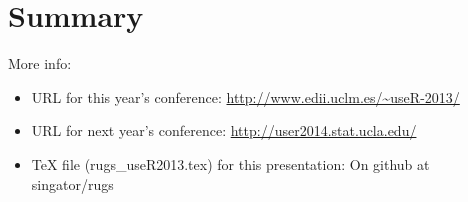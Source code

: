 \documentclass{beamer}
\begin{document}
\section*{Summary}
\begin{frame}
More info:
\begin{itemize}
 \item URL for this year's conference: \url{http://www.edii.uclm.es/~useR-2013/}
 \item URL for next year's conference: \url{http://user2014.stat.ucla.edu/}
 \item TeX file (rugs\_useR2013.tex) for this presentation: On github at singator/rugs
\end{itemize}
\end{frame}
%
%
%
%
%
\end{document}

